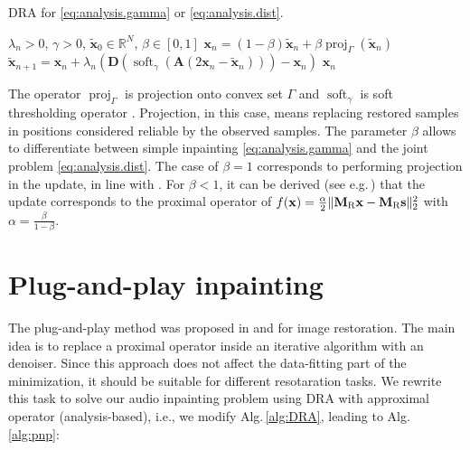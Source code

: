 \documentclass[conference]{IEEEtran}
\newcommand{\todo}[1]{\textcolor{red}{#1}}
\begin{document}
\vspace{-1.5ex} 
\begin{algorithm}
	\caption{DRA for \eqref{eq:analysis.gamma} or \eqref{eq:analysis.dist}.}
	\begin{algorithmic}[1]\label{alg:DRA}
		\renewcommand{\algorithmicrequire}{\textbf{Input:}}
		\renewcommand{\algorithmicensure}{\textbf{Output:}}
		\REQUIRE $ \lambda_n > 0 $, $ \gamma>0 $, $ \mathbf{\widetilde{x}}_0 \in \mathbb{R}^{N} $, $\beta \in [0, 1]$
		\STATE $\mathbf{x}_n= (1-\beta)\mathbf{\widetilde{x}}_n + \beta \operatorname{proj}_{\Gamma}(\mathbf{\widetilde{x}}_n) $ 
		\STATE $ \mathbf{\widetilde{x}}_{n+1} = \mathbf{x}_n + \lambda_n \left( \mathbf{D}\left(\operatorname{soft}_{\gamma}\left(\mathbf{A}\left(2\mathbf{x}_n-\mathbf{\widetilde{x}}_n\right) \right)\right) -\mathbf{x}_n\right)$
		\ENDFOR
		\RETURN $\mathbf{x}_n$ %
	\end{algorithmic} 
\end{algorithm}
\vspace{-1.5ex} 

The operator $ \operatorname{proj}_{\Gamma}$ is projection onto convex set $ \Gamma $ and $\operatorname{soft}_{\gamma}$ is soft thresholding operator \cite{Combettes2011}.
Projection, in this case, means replacing restored samples in positions considered reliable by the observed samples.
The parameter $\beta$ allows to differentiate between simple inpainting \eqref{eq:analysis.gamma} and the joint problem \eqref{eq:analysis.dist}.
The case of $\beta = 1$ corresponds to performing projection in the update, in line with \cite{Mokry2020}.
For $\beta < 1$, it can be derived (see e.g.\,\cite[Sec.\,4 and Tab.\,1]{Combettes2011}) that the update corresponds to the proximal operator of $f(\mathbf{x}) = \frac{\alpha}{2} \Vert \mathbf{M}_{\textup{R}} \mathbf {x} - \mathbf{M}_{\textup{R}} \mathbf{s} \Vert^2_2$ with $\alpha = \frac{\beta}{1-\beta}$.


\section{Plug-and-play inpainting} \label{sec:plugaandplay}

The plug-and-play method was proposed in \cite{Venkatakrishnan2013} and \cite{Chan2016} for image restoration.
The main idea is to replace a proximal operator inside an iterative algorithm with an denoiser.
Since this approach does not affect the data-fitting part of the minimization, it should be suitable for different resotaration tasks.
We rewrite this task to solve our audio inpainting problem using DRA with approximal operator (analysis-based), i.e., we modify Alg.\,\ref{alg:DRA}, leading to Alg.\,\ref{alg:pnp}:
\end{document}
